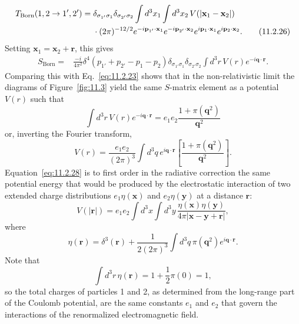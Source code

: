 \begin{align}
  T_{\mathrm{Born}}(1,2\to1',2')={}&
  \delta_{\sigma_{1'}\sigma_1}\delta_{\sigma_{2'}\sigma_2}
  \int d^3x_1\int d^3x_2\,V(|\mathbf x_1-\mathbf x_2|)\notag\\
  &\cdot(2\pi)^{-12/2}e^{-i\mathbf p_{1'}\cdot\mathbf x_1}
  e^{-i\mathbf p_{2'}\cdot\mathbf x_2}
  e^{i\mathbf p_1\cdot\mathbf x_1}e^{i\mathbf p_2\cdot\mathbf x_2}.
  \tag{11.2.26}\label{eq:11.2.26}
\end{align}
Setting $\mathbf x_1=\mathbf x_2+\mathbf r$, this gives
\begin{align}
  S_{\mathrm{Born}}={}&\frac{-i}{4\pi^2}
  \delta^4(p_{1'}+p_{2'}-p_1-p_2)
  \delta_{\sigma_{1'}\sigma_1}\delta_{\sigma_{2'}\sigma_2}
  \int d^3r\,V(r)e^{-i\mathbf q\cdot\mathbf r}.
  \tag{11.2.27}\label{eq:11.2.27}
\end{align}
Comparing this with Eq.~\eqref{eq:11.2.23} shows that in the non-relativistic limit
the diagrams of Figure~\ref{fig:11.3} yield the same $S$-matrix element as a potential
$V(r)$ such that
\[
  \int d^3r\,V(r)e^{-i\mathbf q\cdot\mathbf r}
  =e_1e_2\frac{1+\pi(\mathbf q^2)}{\mathbf q^2}
\]
or, inverting the Fourier transform,
\begin{equation}
  V(r)=\frac{e_1e_2}{(2\pi)^3}\int d^3q\,e^{i\mathbf q\cdot\mathbf r}
  \left[\frac{1+\pi(\mathbf q^2)}{\mathbf q^2}\right].
  \tag{11.2.28}\label{eq:11.2.28}
\end{equation}
Equation~\eqref{eq:11.2.28} is to first order in the radiative correction the same
potential energy that would be produced by the electrostatic interaction of
two extended charge distributions $e_1\eta(\mathbf x)$ and
$e_2\eta(\mathbf y)$ at a distance $\mathbf r$:
\begin{equation}
  V(|\mathbf r|)=e_1e_2\int d^3x\int d^3y\,
  \frac{\eta(\mathbf x)\eta(\mathbf y)}{4\pi|\mathbf x-\mathbf y+\mathbf r|},
  \tag{11.2.29}\label{eq:11.2.29}
\end{equation}
where
\begin{equation}
  \eta(\mathbf r)=\delta^3(\mathbf r)+\frac1{2(2\pi)^3}
  \int d^3q\,\pi(\mathbf q^2)e^{i\mathbf q\cdot\mathbf r}.
  \tag{11.2.30}\label{eq:11.2.30}
\end{equation}
Note that
\begin{equation}
  \int d^3r\,\eta(\mathbf r)=1+\frac12\pi(0)=1,
  \tag{11.2.31}\label{eq:11.2.31}
\end{equation}
so the total charges of particles 1 and 2, as determined from the long-range
part of the Coulomb potential, are the same constants $e_1$ and $e_2$ that
govern the interactions of the renormalized electromagnetic field.

